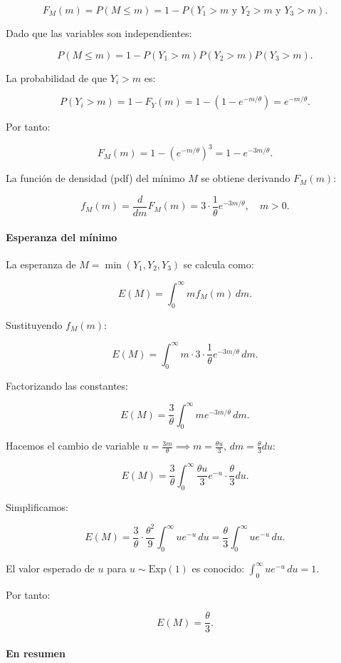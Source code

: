 \documentclass[
]{article}
\begin{document}
\[
F_M(m) = P(M \leq m) = 1 - P(Y_1 > m \text{ y } Y_2 > m \text{ y } Y_3 > m).
\]

Dado que las variables son independientes:

\[
P(M \leq m) = 1 - P(Y_1 > m) P(Y_2 > m) P(Y_3 > m).
\]

La probabilidad de que \(Y_i > m\) es:

\[
P(Y_i > m) = 1 - F_Y(m) = 1 - \left(1 - e^{-m/\theta}\right) = e^{-m/\theta}.
\]

Por tanto:

\[
F_M(m) = 1 - (e^{-m/\theta})^3 = 1 - e^{-3m/\theta}.
\]

La función de densidad (pdf) del mínimo \(M\) se obtiene derivando \(F_M(m)\):

\[
f_M(m) = \frac{d}{dm} F_M(m) = 3 \cdot \frac{1}{\theta} e^{-3m/\theta}, \quad m > 0.
\]

\paragraph{Esperanza del mínimo}\label{esperanza-del-muxednimo}

La esperanza de \(M = \min(Y_1, Y_2, Y_3)\) se calcula como:

\[
E(M) = \int_0^\infty m f_M(m) \, dm.
\]

Sustituyendo \(f_M(m)\):

\[
E(M) = \int_0^\infty m \cdot 3 \cdot \frac{1}{\theta} e^{-3m/\theta} \, dm.
\]

Factorizando las constantes:

\[
E(M) = \frac{3}{\theta} \int_0^\infty m e^{-3m/\theta} \, dm.
\]

Hacemos el cambio de variable \(u = \frac{3m}{\theta} \implies m = \frac{\theta u}{3}, \, dm = \frac{\theta}{3} du\):

\[
E(M) = \frac{3}{\theta} \int_0^\infty \frac{\theta u}{3} e^{-u} \cdot \frac{\theta}{3} du.
\]

Simplificamos:

\[
E(M) = \frac{3}{\theta} \cdot \frac{\theta^2}{9} \int_0^\infty u e^{-u} \, du = \frac{\theta}{3} \int_0^\infty u e^{-u} \, du.
\]

El valor esperado de \(u\) para \(u \sim \text{Exp}(1)\) es conocido: \(\int_0^\infty u e^{-u} \, du = 1\).

Por tanto:

\[
E(M) = \frac{\theta}{3}.
\]

\paragraph{En resumen}\label{en-resumen}
\end{document}
